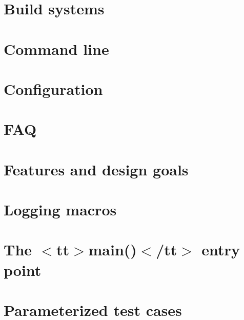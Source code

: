 \let\mypdfximage\pdfximage\def\pdfximage{\immediate\mypdfximage}\documentclass[twoside]{book}
\newcommand{\+}{\discretionary{\mbox{\scriptsize$\hookleftarrow$}}{}{}}
\begin{document}
\chapter{Build systems}
\label{md_external_doctest_doc_markdown_build-systems}

\chapter{Command line}
\label{md_external_doctest_doc_markdown_commandline}

\chapter{Configuration}
\label{md_external_doctest_doc_markdown_configuration}

\chapter{F\+AQ}
\label{md_external_doctest_doc_markdown_faq}

\chapter{Features and design goals}
\label{md_external_doctest_doc_markdown_features}

\chapter{Logging macros}
\label{md_external_doctest_doc_markdown_logging}

\chapter{The $<$tt$>$main()$<$/tt$>$ entry point}
\label{md_external_doctest_doc_markdown_main}

\chapter{Parameterized test cases}
\label{md_external_doctest_doc_markdown_parameterized-tests}

\end{document}
